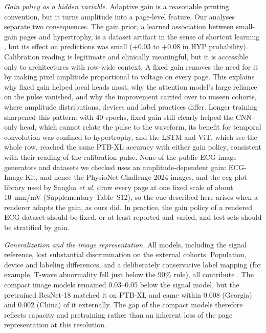 \documentclass[journal]{IEEEtran}
\begin{document}
\emph{Gain policy as a hidden variable.} Adaptive gain is a reasonable printing convention, but it turns amplitude into a page-level feature. Our analyses separate two consequences. The gain prior, a learned association between small-gain pages and hypertrophy, is a dataset artifact in the sense of shortcut learning \cite{geirhos2020shortcut}, but its effect on predictions was small ($+0.03$ to $+0.08$ in HYP probability). Calibration reading is legitimate and clinically meaningful, but it is accessible only to architectures with row-wide context. A fixed gain removes the need for it by making pixel amplitude proportional to voltage on every page. This explains why fixed gain helped local heads most, why the attention model's large reliance on the pulse vanished, and why the improvement carried over to unseen cohorts, where amplitude distributions, devices and label practices differ. Longer training sharpened this pattern: with 40 epochs, fixed gain still clearly helped the CNN-only head, which cannot relate the pulse to the waveform, its benefit for temporal convolution was confined to hypertrophy, and the LSTM and ViT, which see the whole row, reached the same PTB-XL accuracy with either gain policy, consistent with their reading of the calibration pulse. None of the public ECG-image generators and datasets we checked uses an amplitude-dependent gain: ECG-Image-Kit, and hence the PhysioNet Challenge 2024 images, and the ecg-plot library used by Sangha \emph{et al.} draw every page at one fixed scale of about 10~mm/mV \cite{shivashankara2024ecgimagekit,reyna2024challenge,reyna2024imagedatabase,sangha2022images} (Supplementary Table~S12), so the cue described here arises when a renderer adapts the gain, as ours did. In practice, the gain policy of a rendered ECG dataset should be fixed, or at least reported and varied, and test sets should be stratified by gain.

\emph{Generalization and the image representation.} All models, including the signal reference, lost substantial discrimination on the external cohorts. Population, device and labeling differences, and a deliberately conservative label mapping (for example, T-wave abnormality fell just below the 90\% rule), all contribute \cite{reyna2022issues}. The compact image models remained 0.03--0.05 below the signal model, but the pretrained ResNet-18 matched it on PTB-XL and came within 0.008 (Georgia) and 0.002 (China) of it externally. The gap of the compact models therefore reflects capacity and pretraining rather than an inherent loss of the page representation at this resolution.
\end{document}
